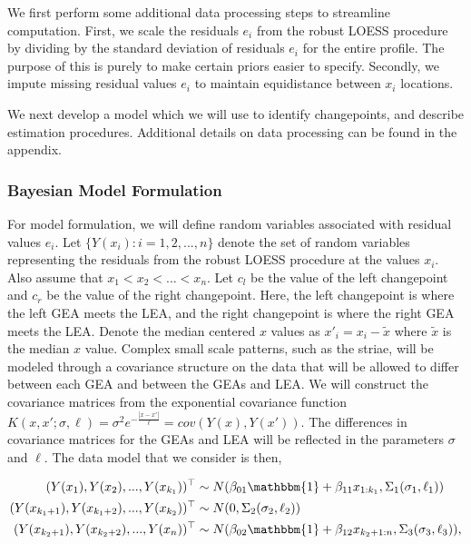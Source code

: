 \documentclass[12pt]{article}
\begin{document}
We first perform some additional data processing steps to streamline
computation. First, we scale the residuals \(e_i\) from the robust LOESS
procedure by dividing by the standard deviation of residuals \(e_i\) for
the entire profile. The purpose of this is purely to make certain priors
easier to specify. Secondly, we impute missing residual values \(e_i\)
to maintain equidistance between \(x_i\) locations.

We next develop a model which we will use to identify changepoints, and
describe estimation procedures. Additional details on data processing
can be found in the appendix.

\subsubsection{Bayesian Model Formulation}

For model formulation, we will define random variables associated with
residual values \(e_i\). Let \(\{Y(x_i): i = 1,2, ..., n\}\) denote the
set of random variables representing the residuals from the robust LOESS
procedure at the values \(x_i\). Also assume that
\(x_1 < x_2 < ... < x_n\). Let \(c_l\) be the value of the left
changepoint and \(c_r\) be the value of the right changepoint. Here, the
left changepoint is where the left GEA meets the LEA, and the right
changepoint is where the right GEA meets the LEA. Denote the median
centered \(x\) values as \(x'_i = x_i - \tilde{x}\) where \(\tilde{x}\)
is the median \(x\) value. Complex small scale patterns, such as the
striae, will be modeled through a covariance structure on the data that
will be allowed to differ between each GEA and between the GEAs and LEA.
We will construct the covariance matrices from the exponential
covariance function
\(K(x, x';\sigma, \ell) = \sigma^2 e^{-\frac{|x - x'|}{\ell}} = cov(Y(x), Y(x'))\).
The differences in covariance matrices for the GEAs and LEA will be
reflected in the parameters \(\sigma\) and \(\ell\). The data model that
we consider is then,

\begin{align}
(Y(x_1), Y(x_2), ..., Y(x_{k_1}))^{\top} &\sim N(\beta_{01}\mathbbm{1} + \beta_{11} x_{1:k_1}, \Sigma_1(\sigma_1, \ell_1)) \\
(Y(x_{k_1 + 1}), Y(x_{k_1 + 2}), ..., Y(x_{k_2}))^{\top} &\sim N(0, \Sigma_2(\sigma_2, \ell_2)) \\ 
(Y(x_{k_2 + 1}), Y(x_{k_2 + 2}), ..., Y(x_n))^{\top} &\sim N(\beta_{02}\mathbbm{1} + \beta_{12} x_{k_2 + 1:n}, \Sigma_3(\sigma_3, \ell_3)),
\end{align}
\end{document}
